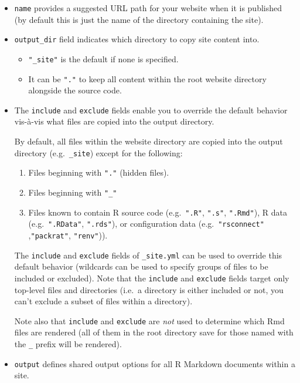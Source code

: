 \documentclass[
  a4paper,
  twoside,
  openright]{book}
\providecommand{\tightlist}{%
  \setlength{\itemsep}{0pt}\setlength{\parskip}{0pt}}
\theoremstyle{definition}
\theoremstyle{definition}
\theoremstyle{definition}
\theoremstyle{definition}
\theoremstyle{remark}
\begin{document}
\begin{itemize}
\item
  \texttt{name} provides a suggested URL path for your website when it is published (by default this is just the name of the directory containing the site).
\item
  \texttt{output\_dir} field indicates which directory to copy site content into.

  \begin{itemize}
  \item
    \texttt{"\_site"} is the default if none is specified.
  \item
    It can be \texttt{"."} to keep all content within the root website directory alongside the source code.
  \end{itemize}
\item
  The \texttt{include} and \texttt{exclude} fields enable you to override the default behavior vis-à-vis what files are copied into the output directory.

  By default, all files within the website directory are copied into the output directory (e.g.~\texttt{\_site}) except for the following:

  \begin{enumerate}
  \def\labelenumi{\arabic{enumi}.}
  \tightlist
  \item
    Files beginning with \texttt{"."} (hidden files).
  \item
    Files beginning with \texttt{"\_"}
  \item
    Files known to contain R source code (e.g.~\texttt{".R"}, \texttt{".s"}, \texttt{".Rmd"}), R data (e.g.~\texttt{".RData"}, \texttt{".rds"}), or configuration data (e.g.~\texttt{"rsconnect"} ,\texttt{"packrat"}, \texttt{"renv"})).
  \end{enumerate}

  The \texttt{include} and \texttt{exclude} fields of \texttt{\_site.yml} can be used to override this default behavior (wildcards can be used to specify groups of files to be included or excluded). Note that the \texttt{include} and \texttt{exclude} fields target only top-level files and directories (i.e.~a directory is either included or not, you can't exclude a subset of files within a directory).

  Note also that \texttt{include} and \texttt{exclude} are \emph{not} used to determine which Rmd files are rendered (all of them in the root directory save for those named with the \texttt{\_} prefix will be rendered).
\item
  \texttt{output} defines shared output options for all R Markdown documents within a site.


\end{itemize}
\end{document}
